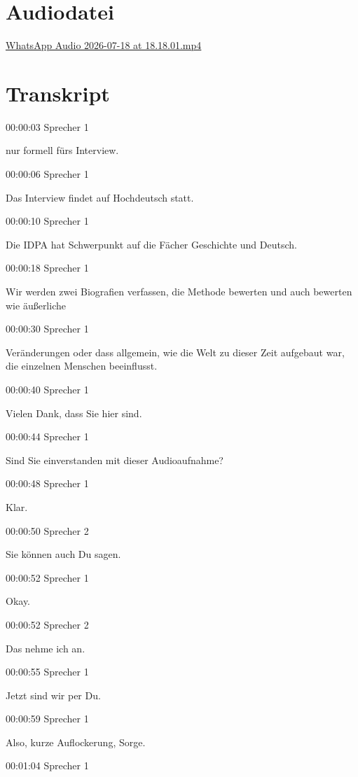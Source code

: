 \section{Audiodatei}\label{audiodatei}

\href{https://sblch-my.sharepoint.com/personal/e037149_sbl_ch/Documents/Transkribierte\%20Datei/WhatsApp\%20Audio\%202026-07-18\%20at\%2018.18.01.mp4}{WhatsApp
Audio 2026-07-18 at 18.18.01.mp4}

\section{Transkript}\label{transkript}

00:00:03 Sprecher 1

nur formell fürs Interview.

00:00:06 Sprecher 1

Das Interview findet auf Hochdeutsch statt.

00:00:10 Sprecher 1

Die IDPA hat Schwerpunkt auf die Fächer Geschichte und Deutsch.

00:00:18 Sprecher 1

Wir werden zwei Biografien verfassen, die Methode bewerten und auch
bewerten wie äußerliche

00:00:30 Sprecher 1

Veränderungen oder dass allgemein, wie die Welt zu dieser Zeit aufgebaut
war, die einzelnen Menschen beeinflusst.

00:00:40 Sprecher 1

Vielen Dank, dass Sie hier sind.

00:00:44 Sprecher 1

Sind Sie einverstanden mit dieser Audioaufnahme?

00:00:48 Sprecher 1

Klar.

00:00:50 Sprecher 2

Sie können auch Du sagen.

00:00:52 Sprecher 1

Okay.

00:00:52 Sprecher 2

Das nehme ich an.

00:00:55 Sprecher 1

Jetzt sind wir per Du.

00:00:59 Sprecher 1

Also, kurze Auflockerung, Sorge.

00:01:04 Sprecher 1

